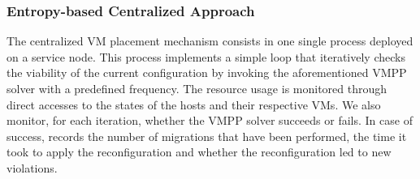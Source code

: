 \vspace*{-.2cm}
\subsubsection{Entropy-based Centralized Approach}
\label{subsec:entropy}
The centralized VM placement mechanism consists in one single \sg
process deployed on a service node. This process implements a simple loop that
iteratively checks the viability of the current configuration by
invoking the aforementioned VMPP solver with a predefined
frequency.
%
The resource usage is monitored through direct accesses
to the states of the hosts and their respective VMs.
%
%
We also monitor, for each iteration, whether the VMPP solver succeeds
or fails. In case of success, \vmps records the number of migrations
that have been performed, the time it took to apply the
reconfiguration and whether the reconfiguration
led to new violations.

